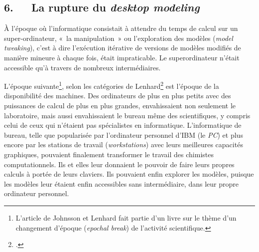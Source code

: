 \documentclass{FramateX}
\begin{document}
\begin{refsection}
\section*{6.~~~La rupture du \textit{desktop modeling}}
{}

À l'époque où l'informatique
consistait à attendre du temps de calcul sur un super-ordinateur, «~la
manipulation~» ou l'exploration des modèles
(\textit{model tweaking}), c'est à dire
l'exécution itérative de versions de modèles modifiés
de manière mineure à chaque fois, était impraticable. Le
superordinateur n'était accessible
qu'à travers de nombreux intermédiaires.

L'époque suivante\footnote{L'article
de Johnsson et Lenhard fait partie d'un livre sur le
thème d'un changement d'époque
(\textit{epochal break}) de l'activité
scientifique.}, selon les catégories de Lenhard\footnote{\cite{Johnson2011}.} est
l'époque de la disponibilité des machines. Des
ordinateurs de plus en plus petits avec des puissances de calcul de
plus en plus grandes, envahissaient non seulement le laboratoire, mais
aussi envahissaient le bureau même des scientifiques, y compris celui
de ceux qui n'étaient pas spécialistes en
informatique. L'informatique de bureau, telle que
popularisée par l'ordinateur personnel
d'IBM (le \textit{PC}) et plus encore par les stations
de travail (\textit{workstations}) avec leurs meilleures capacités
graphiques, pouvaient finalement transformer le travail des chimistes
computationnels. Ils et elles leur donnaient le pouvoir de faire leurs
propres calculs à portée de leurs claviers. Ils pouvaient enfin
explorer les modèles, puisque les modèles leur étaient enfin
accessibles sans intermédiaire, dans leur propre ordinateur personnel.


\end{refsection}
\end{document}
